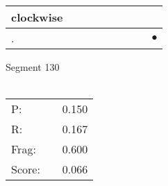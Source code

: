 \documentclass[landscape]{article}
\newcommand{\ssp}{\hspace{2pt}}
\newcommand{\mex}{\cellcolor{g}$\bullet$}
\begin{document}
\begin{tabular}{|l|p{10pt}|p{10pt}|p{10pt}|p{10pt}|p{10pt}|p{10pt}|p{10pt}|p{10pt}|}
\hline
\ssp clockwise \ssp&\hspace{2pt}&\hspace{2pt}&\hspace{2pt}&\hspace{2pt}&\hspace{2pt}&\hspace{2pt}&\hspace{2pt}&\hspace{2pt}\\
\hline
\ssp \cellcolor{ref7}. \ssp&\hspace{2pt}&\hspace{2pt}&\hspace{2pt}&\hspace{2pt}&\hspace{2pt}&\hspace{2pt}&\hspace{2pt}&\hspace{2pt}\mex\\
\hline
\end{tabular}

\vspace{6pt}
\noindent Segment 130\\\\
\noindent\begin{tabular}{lm{12pt}r}
\hline
P:&&0.150\\
R:&&0.167\\
Frag:&&0.600\\
Score:&&0.066\\
\end{tabular}

\newpage
\end{document}
